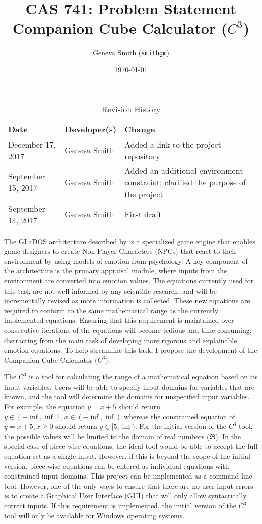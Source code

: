 \documentclass{article}
\title{CAS 741: Problem Statement\\Companion Cube Calculator ($C^{3}$)}
\author{Geneva Smith (\texttt{smithgm})}
\date{\today}
\begin{document}
\maketitle

\begin{table}[hp]
\caption{Revision History} \label{TblRevisionHistory}
\begin{tabularx}{\textwidth}{llX}
\toprule
\textbf{Date} & \textbf{Developer(s)} & \textbf{Change}\\
\midrule
December 17, 2017 & Geneva Smith & Added a link to the project repository \\
September 15, 2017 & Geneva Smith & Added an additional environment constraint; 
clarified the purpose of the project \\
September 14, 2017 & Geneva Smith & First draft \\
\bottomrule
\end{tabularx}
\end{table}

The GLaDOS architecture described by \citet{glados} is a specialized game 
engine that enables game designers to create Non-Player Characters (NPCs) that 
react to their environment by using models of emotion from psychology. A key 
component of the architecture is the primary appraisal module, where inputs 
from the environment are converted into emotion values. The equations currently 
used for this task are not well informed by any scientific research, and will 
be incrementally revised as more information is collected. These new equations 
are required to conform to the same mathematical range as the currently 
implemented equations. Ensuring that this requirement is maintained over 
consecutive iterations of the equations will become tedious and time consuming, 
distracting from the main task of developing more rigorous and explainable 
emotion equations. To help streamline this task, I propose the development of 
the Companion Cube Calculator ($C^{3}$).

The $C^{3}$ is a tool for calculating the range of a mathematical equation 
based on its input variables. Users will be able to specify input domains for 
variables that are known, and the tool will determine the domains for 
unspecified input variables. For example, the equation $y = x + 5$ should 
return $y \in (-\inf, \inf), x \in (-\inf, \inf)$ whereas the constrained 
equation of $y = x + 5, x \geq 0$ should return $y \in [5, \inf)$. For the 
initial version of the $C^{3}$ tool, the possible values will be limited to the 
domain of real numbers ($\Re$). In the special case of piece-wise equations, 
the ideal tool would be able to accept the full equation set as a single input. 
However, if this is beyond the scope of the initial version, piece-wise 
equations can be entered as individual equations with constrained input 
domains. This project can be implemented as a command line tool. However, one 
of the only ways to ensure that there are no user input errors is to create a 
Graphical User Interface (GUI) that will only allow syntactically correct 
inputs. If this requirement is implemented, the initial version of the $C^{3}$ 
tool will only be available for Windows operating systems.
\end{document}
